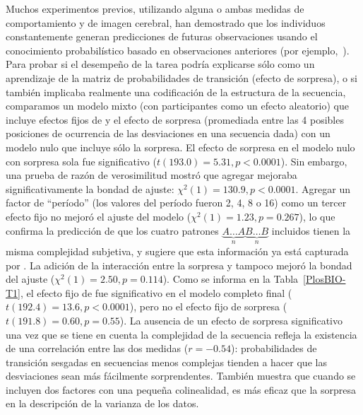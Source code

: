 Muchos experimentos previos, utilizando alguna o ambas medidas de comportamiento y de imagen cerebral, han demostrado que los individuos constantemente generan predicciones de futuras observaciones usando el conocimiento probabilístico basado en observaciones anteriores (por ejemplo,~\cite{f19,f20}). Para probar si el desempeño de la tarea podría explicarse sólo como un aprendizaje de la matriz de probabilidades de transición (efecto de sorpresa), o si también implicaba realmente una codificación de la estructura de la secuencia, comparamos un modelo mixto (con participantes como un efecto aleatorio) que incluye efectos fijos de \mdlbin y el efecto de sorpresa (promediada entre las 4 posibles posiciones de ocurrencia de las desviaciones en una secuencia dada) con un modelo nulo que incluye sólo la sorpresa. El efecto de sorpresa en el modelo nulo con sorpresa sola fue significativo ($t(193.0) = 5.31, p < 0.0001$). Sin embargo, una prueba de razón de verosimilitud mostró que agregar \mdlbin mejoraba significativamente la bondad de ajuste: $\chi^2(1) = 130.9, p < 0.0001$. Agregar un factor de ``período'' (los valores del período fueron 2, 4, 8 o 16) como un tercer efecto fijo no mejoró el ajuste del modelo ($\chi^2(1) = 1.23, p = 0.267$), lo que confirma la predicción de que los cuatro patrones $\underbrace{A \dots A}_{n}\underbrace{B \dots B}_{n}$ incluidos tienen la misma complejidad subjetiva, y sugiere que esta información ya está capturada por \mdlbin. La adición de la interacción entre la sorpresa y \mdlbin tampoco mejoró la bondad del ajuste ($\chi^2(1) = 2.50, p = 0.114$). Como se informa en la Tabla~\ref{PlosBIO-T1}, el efecto fijo de \mdlbin fue significativo en el modelo completo final ($t(192.4) = 13.6, p < 0.0001$), pero no el efecto fijo de sorpresa ($t (191.8) = 0.60, p = 0.55$). La ausencia de un efecto de sorpresa significativo una vez que se tiene en cuenta la complejidad de la secuencia refleja la existencia de una correlación entre las dos medidas ($r = -0.54$): probabilidades de transición sesgadas en secuencias menos complejas tienden a hacer que las desviaciones sean más fácilmente sorprendentes. También muestra que cuando se incluyen dos factores con una pequeña colinealidad, \mdlbin es más eficaz que la sorpresa en la descripción de la varianza de los datos.



